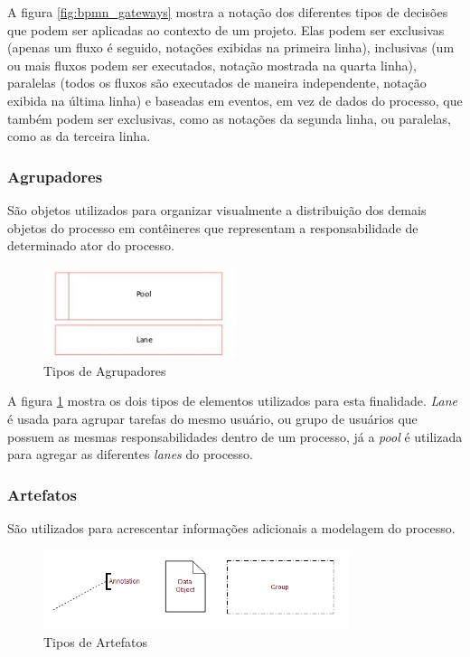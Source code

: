     A figura \ref{fig:bpmn_gateways} mostra a notação dos diferentes tipos de decisões que podem ser aplicadas ao contexto de um projeto. Elas podem ser exclusivas (apenas um fluxo é seguido, notações exibidas na primeira linha), inclusivas (um ou mais fluxos podem ser executados, notação mostrada na quarta linha), paralelas (todos os fluxos são executados de maneira independente, notação exibida na última linha) e baseadas em eventos, em vez de dados do processo, que também podem ser exclusivas, como as notações da segunda linha, ou paralelas, como as da terceira linha.


\subsubsection{Agrupadores}\label{sec:bpm-bpmn_objetos_agrupadores}

    São objetos utilizados para organizar visualmente a distribuição dos demais objetos do processo em contêineres que representam a responsabilidade de determinado ator do processo.

    \begin{figure}[H]
    \centering
    \includegraphics[width=0.5\textwidth]{imagens/bpmn_swimlanes.jpg}
    \caption{Tipos de Agrupadores}
    \label{fig:bpmn_swimlanes}
    \end{figure}
    
    A figura \ref{fig:bpmn_swimlanes} mostra os dois tipos de elementos utilizados para esta finalidade. \textit{Lane} é usada para agrupar tarefas do mesmo usuário, ou grupo de usuários que possuem as mesmas responsabilidades dentro de um processo, já a \textit{pool} é utilizada para agregar as diferentes \textit{lanes} do processo. 

\subsubsection{Artefatos}\label{sec:bpm-bpmn_objetos_artefatos}

    São utilizados para acrescentar informações adicionais a modelagem do processo. 

    \begin{figure}[H]
    \centering
    \includegraphics[width=0.8\textwidth]{imagens/bpmn_artifacts.jpg}
    \caption{Tipos de Artefatos}
    \label{fig:bpmn_artifacts}
    \end{figure}
    
